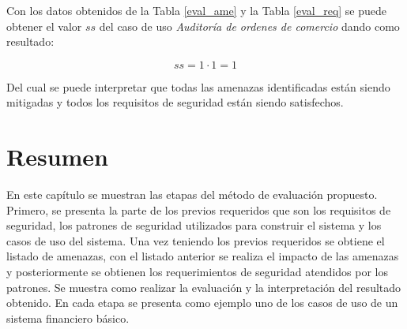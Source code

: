 Con los datos obtenidos de la Tabla \ref{eval_ame} y la Tabla \ref{eval_req} se puede obtener el valor $ss$ del caso de uso \textit{Auditoría de ordenes de comercio} dando como resultado:

\begin{equation*}
	ss = 1 \cdot 1 = 1
\end{equation*}

Del cual se puede interpretar que todas las amenazas identificadas están siendo mitigadas y  todos los requisitos de seguridad están siendo satisfechos.

\section{Resumen}

En este capítulo se muestran las etapas del método de evaluación propuesto. Primero, se presenta la parte de los previos requeridos que son los requisitos de seguridad, los patrones de seguridad utilizados para construir el sistema y los casos de uso del sistema. Una vez teniendo los previos requeridos se obtiene el listado de amenazas, con el listado anterior se realiza el impacto de las amenazas y posteriormente se obtienen los requerimientos de seguridad atendidos por los patrones. Se muestra como realizar la evaluación y la interpretación del resultado obtenido. En cada etapa se presenta como ejemplo uno de los casos de uso de un sistema financiero básico.


